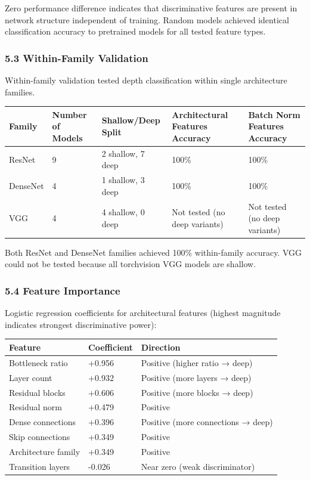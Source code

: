 Zero performance difference indicates that discriminative features are present in network structure independent of training. Random models achieved identical classification accuracy to pretrained models for all tested feature types.

\subsubsection{5.3 Within-Family Validation}

Within-family validation tested depth classification within single architecture families.

\begin{table}[htbp]
\centering
\begin{tabular}{lllll}
\toprule
Family & Number of Models & Shallow/Deep Split & Architectural Features Accuracy & Batch Norm Features Accuracy \\
\midrule
ResNet & 9 & 2 shallow, 7 deep & 100\% & 100\% \\
DenseNet & 4 & 1 shallow, 3 deep & 100\% & 100\% \\
VGG & 4 & 4 shallow, 0 deep & Not tested (no deep variants) & Not tested (no deep variants) \\
\bottomrule
\end{tabular}
\end{table}

Both ResNet and DenseNet families achieved 100\% within-family accuracy. VGG could not be tested because all torchvision VGG models are shallow.

\subsubsection{5.4 Feature Importance}

Logistic regression coefficients for architectural features (highest magnitude indicates strongest discriminative power):

\begin{table}[htbp]
\centering
\begin{tabular}{lll}
\toprule
Feature & Coefficient & Direction \\
\midrule
Bottleneck ratio & +0.956 & Positive (higher ratio → deep) \\
Layer count & +0.932 & Positive (more layers → deep) \\
Residual blocks & +0.606 & Positive (more blocks → deep) \\
Residual norm & +0.479 & Positive \\
Dense connections & +0.396 & Positive (more connections → deep) \\
Skip connections & +0.349 & Positive \\
Architecture family & +0.349 & Positive \\
Transition layers & -0.026 & Near zero (weak discriminator) \\
\bottomrule
\end{tabular}
\end{table}


